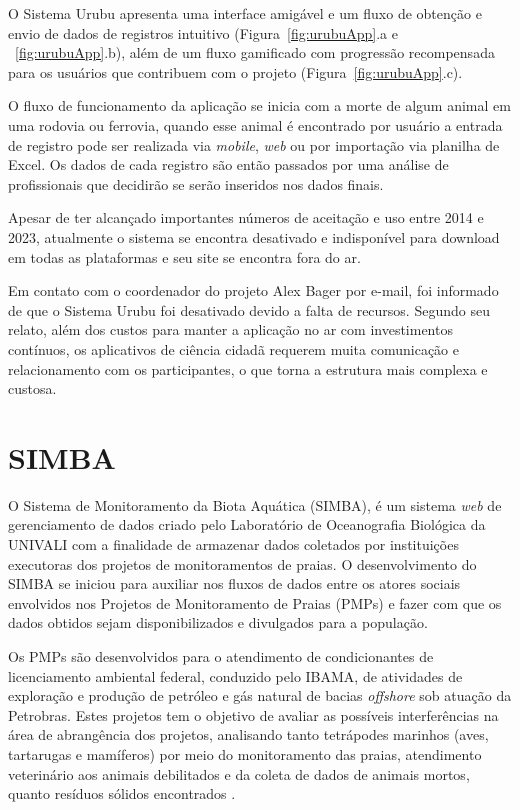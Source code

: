 O Sistema Urubu apresenta uma interface amigável e um fluxo de obtenção e envio de dados de registros intuitivo (Figura~\ref{fig:urubuApp}.a e ~\ref{fig:urubuApp}.b), além de um fluxo gamificado com progressão recompensada para os usuários que contribuem com o projeto (Figura~\ref{fig:urubuApp}.c).

O fluxo de funcionamento da aplicação se inicia com a morte de algum animal em uma rodovia ou ferrovia, quando esse animal é encontrado por usuário a entrada de registro pode ser realizada via \textit{mobile}, \textit{web} ou por importação via planilha de Excel. Os dados de cada registro são então passados por uma análise de profissionais que decidirão se serão inseridos nos dados finais.

Apesar de ter alcançado importantes números de aceitação e uso entre 2014 e 2023, atualmente o sistema se encontra desativado e indisponível para download em todas as plataformas e seu site se encontra fora do ar.

Em contato com o coordenador do projeto Alex Bager por e-mail, foi informado de que o Sistema Urubu foi desativado devido a falta de recursos. Segundo seu relato, além dos custos para manter a aplicação no ar com investimentos contínuos, os aplicativos de ciência cidadã requerem muita comunicação e relacionamento com os participantes, o que torna a estrutura mais complexa e custosa.

\section{SIMBA}\label{simba}

O Sistema de Monitoramento da Biota Aquática (SIMBA), é um sistema \textit{web} de gerenciamento de dados criado pelo Laboratório de Oceanografia Biológica da UNIVALI com a finalidade de armazenar dados coletados por instituições executoras dos projetos de monitoramentos de praias. O desenvolvimento do SIMBA se iniciou para auxiliar nos fluxos de dados entre os atores sociais envolvidos nos Projetos de Monitoramento de Praias (PMPs) e fazer com que os dados obtidos sejam disponibilizados e divulgados para a população.

Os PMPs são desenvolvidos para o atendimento de condicionantes de licenciamento ambiental federal, conduzido pelo IBAMA, de atividades de exploração e produção de petróleo e gás natural de bacias \textit{offshore} sob atuação da Petrobras. Estes projetos tem o objetivo de avaliar as possíveis interferências na área de abrangência dos projetos, analisando tanto tetrápodes marinhos (aves, tartarugas e mamíferos) por meio do monitoramento das praias, atendimento veterinário aos animais debilitados e da coleta de dados de animais mortos, quanto resíduos sólidos encontrados \cite{petrobras_simba_2024}.

